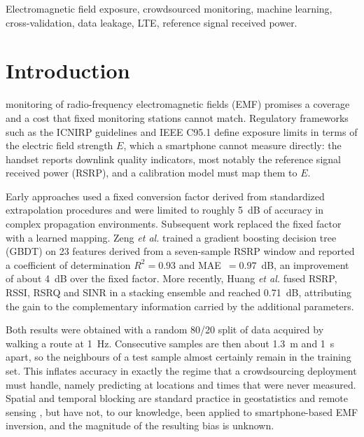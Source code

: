 \documentclass{ieeeaccess}
\begin{document}
\begin{keywords}
Electromagnetic field exposure, crowdsourced monitoring, machine learning,
cross-validation, data leakage, LTE, reference signal received power.
\end{keywords}

\titlepgskip=-21pt

\maketitle

\section{Introduction}
\label{sec:introduction}
 monitoring of radio-frequency electromagnetic fields
(EMF) promises a coverage and a cost that fixed monitoring stations cannot match\cite{aerts2013,ganti2011,lane2010}.
Regulatory frameworks such as the ICNIRP guidelines \cite{icnirp} and IEEE C95.1\cite{ieee2019} define exposure
limits in terms of the electric field strength $E$, which a smartphone cannot
measure directly: the handset reports downlink quality indicators, most notably
the reference signal received power (RSRP), and a calibration model must map them
to $E$.

Early approaches used a fixed conversion factor derived from standardized
extrapolation procedures \cite{schie} and were limited to roughly 5~dB of
accuracy in complex propagation environments. Subsequent work replaced the fixed
factor with a learned mapping. Zeng \emph{et al.} \cite{zeng2024} trained a
gradient boosting decision tree (GBDT) \cite{friedman,friedman2002,hastie2009} on 23 features derived
from a seven-sample RSRP window and reported a coefficient of determination
$R^2=0.93$ and MAE~$=0.97$~dB, an improvement of about 4~dB over the fixed
factor.
More recently, Huang \emph{et al.} \cite{huang2026} fused RSRP, RSSI, RSRQ and
SINR in a stacking ensemble and reached 0.71~dB, attributing the gain to the
complementary information carried by the additional parameters.

Both results were obtained with a random 80/20 split of data acquired by walking a
route at 1~Hz. Consecutive samples are then about 1.3~m and 1~s apart, so the
neighbours of a test sample almost certainly remain in the training set. This
inflates accuracy in exactly the regime that a crowdsourcing deployment must
handle, namely predicting at locations and times that were never measured.
Spatial and temporal blocking are standard practice in geostatistics and remote
sensing \cite{roberts,kara,pohjankukka2017,meyer2021,valavi2019}, but have not, to our knowledge, been applied to
smartphone-based EMF inversion, and the magnitude of the resulting bias is
unknown.
\end{document}
